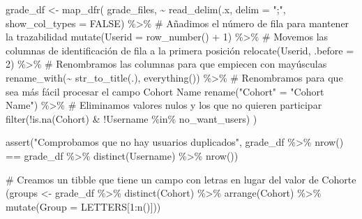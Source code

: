 \documentclass[
  12pt,
  a4paper,
  extrafontsizes,
  onecolumn,
  openright]{memoir}
\newenvironment{Shaded}{\begin{snugshade}}{\end{snugshade}}
\newcommand{\AttributeTok}[1]{\textcolor[rgb]{0.40,0.45,0.13}{#1}}
\newcommand{\CommentTok}[1]{\textcolor[rgb]{0.37,0.37,0.37}{#1}}
\newcommand{\ConstantTok}[1]{\textcolor[rgb]{0.56,0.35,0.01}{#1}}
\newcommand{\DecValTok}[1]{\textcolor[rgb]{0.68,0.00,0.00}{#1}}
\newcommand{\FunctionTok}[1]{\textcolor[rgb]{0.28,0.35,0.67}{#1}}
\newcommand{\NormalTok}[1]{\textcolor[rgb]{0.00,0.23,0.31}{#1}}
\newcommand{\OtherTok}[1]{\textcolor[rgb]{0.00,0.23,0.31}{#1}}
\newcommand{\SpecialCharTok}[1]{\textcolor[rgb]{0.37,0.37,0.37}{#1}}
\newcommand{\StringTok}[1]{\textcolor[rgb]{0.13,0.47,0.30}{#1}}
\begin{document}
\begin{Shaded}
\begin{Highlighting}[]
\NormalTok{grade\_df }\OtherTok{\textless{}{-}} \FunctionTok{map\_dfr}\NormalTok{(}
\NormalTok{    grade\_files, }\SpecialCharTok{\textasciitilde{}} \FunctionTok{read\_delim}\NormalTok{(.x, }\AttributeTok{delim =} \StringTok{";"}\NormalTok{, }\AttributeTok{show\_col\_types =} \ConstantTok{FALSE}\NormalTok{) }\SpecialCharTok{\%\textgreater{}\%}
        \CommentTok{\# Añadimos el número de fila para mantener la trazabilidad}
        \FunctionTok{mutate}\NormalTok{(}\AttributeTok{Userid =} \FunctionTok{row\_number}\NormalTok{() }\SpecialCharTok{+} \DecValTok{1}\NormalTok{) }\SpecialCharTok{\%\textgreater{}\%} 
        \CommentTok{\# Movemos las columnas de identificación de fila a la primera posición}
        \FunctionTok{relocate}\NormalTok{(Userid, }\AttributeTok{.before =} \DecValTok{2}\NormalTok{) }\SpecialCharTok{\%\textgreater{}\%}
        \CommentTok{\# Renombramos las columnas para que empiecen con mayúsculas}
        \FunctionTok{rename\_with}\NormalTok{(}\SpecialCharTok{\textasciitilde{}} \FunctionTok{str\_to\_title}\NormalTok{(.), }\FunctionTok{everything}\NormalTok{()) }\SpecialCharTok{\%\textgreater{}\%} 
        \CommentTok{\# Renombramos para que sea más fácil procesar el campo Cohort Name}
        \FunctionTok{rename}\NormalTok{(}\StringTok{"Cohort"} \OtherTok{=} \StringTok{"Cohort Name"}\NormalTok{) }\SpecialCharTok{\%\textgreater{}\%}
        \CommentTok{\# Eliminamos valores nulos y los que no quieren participar}
        \FunctionTok{filter}\NormalTok{(}\SpecialCharTok{!}\FunctionTok{is.na}\NormalTok{(Cohort) }\SpecialCharTok{\&} \SpecialCharTok{!}\NormalTok{Username }\SpecialCharTok{\%in\%}\NormalTok{ no\_want\_users) }
\NormalTok{)}

\FunctionTok{assert}\NormalTok{(}\StringTok{"Comprobamos que no hay usuarios duplicados"}\NormalTok{, grade\_df }\SpecialCharTok{\%\textgreater{}\%} 
    \FunctionTok{nrow}\NormalTok{() }\SpecialCharTok{==}\NormalTok{ grade\_df }\SpecialCharTok{\%\textgreater{}\%}
    \FunctionTok{distinct}\NormalTok{(Username) }\SpecialCharTok{\%\textgreater{}\%}
    \FunctionTok{nrow}\NormalTok{())}

\CommentTok{\# Creamos un tibble que tiene un campo con letras en lugar del valor de Cohorte}
\NormalTok{(groups }\OtherTok{\textless{}{-}}\NormalTok{ grade\_df }\SpecialCharTok{\%\textgreater{}\%}
    \FunctionTok{distinct}\NormalTok{(Cohort) }\SpecialCharTok{\%\textgreater{}\%}
    \FunctionTok{arrange}\NormalTok{(Cohort) }\SpecialCharTok{\%\textgreater{}\%}
    \FunctionTok{mutate}\NormalTok{(}\AttributeTok{Group =}\NormalTok{ LETTERS[}\DecValTok{1}\SpecialCharTok{:}\FunctionTok{n}\NormalTok{()]))}


\end{Highlighting}
\end{Shaded}
\end{document}
